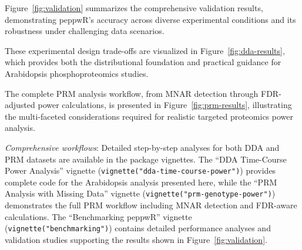 
Figure~\ref{fig:validation} summarizes the comprehensive validation results, demonstrating peppwR's accuracy across diverse experimental conditions and its robustness under challenging data scenarios.

These experimental design trade-offs are visualized in Figure~\ref{fig:dda-results}, which provides both the distributional foundation and practical guidance for Arabidopsis phosphoproteomics studies.

The complete PRM analysis workflow, from MNAR detection through FDR-adjusted power calculations, is presented in Figure~\ref{fig:prm-results}, illustrating the multi-faceted considerations required for realistic targeted proteomics power analysis.


\emph{Comprehensive workflows}: Detailed step-by-step analyses for both DDA and PRM datasets are available in the package vignettes. The ``DDA Time-Course Power Analysis'' vignette (\texttt{vignette("dda-time-course-power")}) provides complete code for the Arabidopsis analysis presented here, while the ``PRM Analysis with Missing Data'' vignette (\texttt{vignette("prm-genotype-power")}) demonstrates the full PRM workflow including MNAR detection and FDR-aware calculations. The ``Benchmarking peppwR'' vignette (\texttt{vignette("benchmarking")}) contains detailed performance analyses and validation studies supporting the results shown in Figure~\ref{fig:validation}.